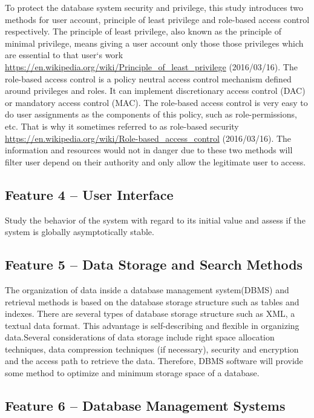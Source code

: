 \documentclass[a4paper]{article} %
\begin{document}
To protect the database system security and privilege, this study introduces two methods for user account, principle of least privilege and role-based access control respectively. The principle of least privilege, also known as the principle of minimal privilege, means giving a user account only those those privileges which are essential to that user`s work \url{https://en.wikipedia.org/wiki/Principle_of_least_privilege} (2016/03/16). The role-based access control is a policy neutral access control mechanism defined around privileges and roles. It can implement discretionary access control (DAC) or mandatory access control (MAC). The role-based access control is very easy to do user assignments as the components of this policy, such as role-permissions, etc. That is why it sometimes referred to as role-based security \url{https://en.wikipedia.org/wiki/Role-based_access_control} (2016/03/16). The information and resources would not in danger due to these two methods will filter user depend on their authority and only allow the legitimate user to access.

\subsection*{Feature 4 -- User Interface}
\label{task1:feature4}

Study the behavior of the system with regard to its initial value and assess if the system is globally asymptotically stable.

\subsection*{Feature 5 -- Data Storage and Search Methods}
\label{task1:feature5}

The organization of data inside a database management system(DBMS) and retrieval methods is based on the database storage structure such as tables and indexes. 
There are several types of database storage structure such as XML, a textual data format. 
This advantage is self-describing and flexible in organizing data.\cite{one}Several considerations of data storage include right space allocation techniques, data compression techniques (if necessary), security and encryption and the access path to retrieve the data. 
Therefore, DBMS software will provide some method to optimize and  minimum storage space of a database.

\subsection*{Feature 6 -- Database Management Systems}
\label{task1:feature6}
\end{document}
